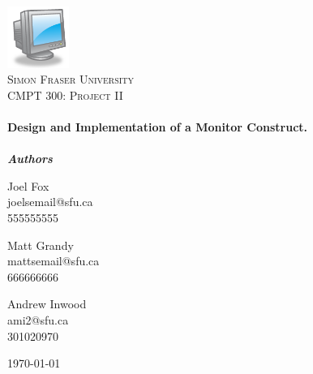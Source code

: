 \begin{titlepage}

\begin{center}


\includegraphics[width=0.15\textwidth]{./logo}\\[1cm]    

\textsc{\LARGE Simon Fraser University}\\[1.5cm]

\textsc{\Large CMPT 300: Project II}\\[0.5cm]


\HRule \\[0.4cm]
{ \huge \bfseries Design and Implementation of a Monitor Construct. }\\[0.4cm]

\HRule \\[1.5cm]
{ \large \bfseries \emph{Authors}}\\[1cm]

\begin{minipage}{0.26\textwidth}
\begin{flushleft} \large
Joel Fox\\
joelsemail@sfu.ca\\
555555555
\end{flushleft}
\end{minipage}
\begin{minipage}{0.26\textwidth}
\centering
\large
Matt Grandy\\
mattsemail@sfu.ca\\
666666666
\end{minipage}
\begin{minipage}{0.26\textwidth}
\begin{flushright} \large
Andrew Inwood\\
ami2@sfu.ca\\
301020970
\end{flushright}
\end{minipage}

\vfill

{\large \today}

\end{center}

\end{titlepage}

